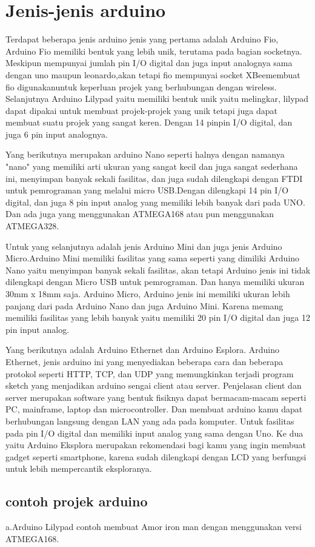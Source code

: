 \section{Jenis-jenis arduino}
	Terdapat beberapa jenis arduino jenis yang pertama adalah Arduino Fio, Arduino Fio memiliki bentuk yang lebih unik, terutama pada bagian socketnya. Meskipun mempunyai jumlah pin I/O digital dan juga input analognya sama dengan uno maupun leonardo,akan tetapi fio mempunyai socket XBeemembuat fio digunakanuntuk keperluan projek yang berhubungan dengan wireless. Selanjutnya Arduino Lilypad yaitu memiliki bentuk unik yaitu melingkar, lilypad dapat dipakai untuk membuat projek-projek yang unik tetapi juga dapat membuat suatu projek yang sangat keren.
	Dengan 14 pinpin I/O digital, dan juga 6 pin input analognya.


	Yang berikutnya merupakan arduino Nano seperti halnya dengan namanya "nano" yang memiliki arti ukuran  yang sangat kecil dan juga sangat sederhana ini, menyimpan banyak sekali fasilitas, dan juga sudah dilengkapi dengan FTDI untuk pemrograman yang melalui micro USB.Dengan dilengkapi 14 pin I/O digital, dan juga 8 pin input analog yang memiliki lebih banyak dari pada UNO. Dan ada juga yang menggunakan ATMEGA168 atau pun menggunakan ATMEGA328.

	Untuk yang selanjutnya adalah jenis Arduino Mini dan juga jenis Arduino Micro.Arduino Mini memiliki fasilitas yang sama seperti yang dimiliki Arduino Nano yaitu menyimpan banyak sekali fasilitas, akan tetapi Arduino jenis ini tidak dilengkapi dengan Micro USB untuk pemrograman. Dan hanya memiliki ukuran 30mm x 18mm saja.
	Arduino Micro, Arduino jenis ini memiliki ukuran lebih panjang dari pada Arduino Nano dan juga Arduino Mini. Karena memang memiliki fasilitas yang lebih banyak yaitu memiliki 20 pin I/O digital dan juga 12 pin input analog.


	Yang berikutnya adalah Arduino Ethernet dan Arduino Esplora. Arduino Ethernet, jenis arduino ini yang menyediakan beberapa cara dan beberapa protokol seperti HTTP, TCP, dan UDP yang memungkinkan terjadi program sketch yang menjadikan arduino sengai client atau server. Penjelasan client dan server merupakan software yang bentuk fisiknya dapat bermacam-macam seperti PC, mainframe, laptop dan microcontroller. Dan membuat arduino kamu dapat berhubungan langsung dengan LAN yang ada pada komputer. Untuk fasilitas pada pin I/O digital dan memiliki input analog yang sama dengan Uno. 
	Ke dua yaitu Arduino Eksplora merupakan rekomendasi bagi kamu yang ingin membuat gadget seperti smartphone, karena sudah dilengkapi dengan LCD yang berfungsi untuk lebih mempercantik eksploranya.

\subsection{contoh projek arduino}
	a.Arduino Lilypad contoh membuat Amor iron man dengan menggunakan versi ATMEGA168.
